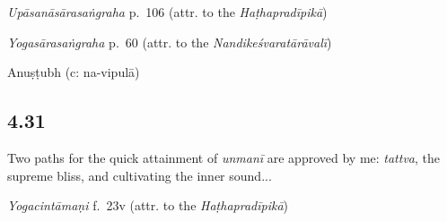 \begin{ekdosis}
\begin{sources}[hp04_030]
\emph{Upāsanāsārasaṅgraha} p.~106 (attr. to the \emph{Haṭhapradīpikā})
\begin{versinnote}
\end{versinnote}

\emph{Yogasārasaṅgraha} p.~60 (attr. to the \emph{Nandikeśvaratārāvalī})
\begin{versinnote}
\end{versinnote}
\end{sources}



\begin{metre}[hp04_030]
Anuṣṭubh (c: na-vipulā)
\end{metre}

\subsection*{4.31}
\begin{translation}[hp04_031]
Two paths for the quick attainment of \emph{unmanī} are approved by me: \emph{tattva}, the supreme bliss, and cultivating the inner sound...
\end{translation}


\begin{testimonia}[hp04_031]
\emph{Yogacintāmaṇi} f.~23v (attr. to the \emph{Haṭhapradīpikā})
\begin{versinnote}
\end{versinnote}


\end{testimonia}
\end{ekdosis}
